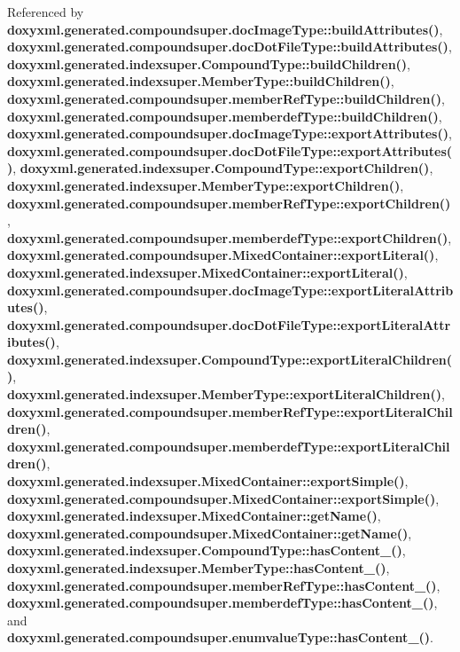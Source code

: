 Referenced by {\bf doxyxml.\+generated.\+compoundsuper.\+doc\+Image\+Type\+::build\+Attributes()}, {\bf doxyxml.\+generated.\+compoundsuper.\+doc\+Dot\+File\+Type\+::build\+Attributes()}, {\bf doxyxml.\+generated.\+indexsuper.\+Compound\+Type\+::build\+Children()}, {\bf doxyxml.\+generated.\+indexsuper.\+Member\+Type\+::build\+Children()}, {\bf doxyxml.\+generated.\+compoundsuper.\+member\+Ref\+Type\+::build\+Children()}, {\bf doxyxml.\+generated.\+compoundsuper.\+memberdef\+Type\+::build\+Children()}, {\bf doxyxml.\+generated.\+compoundsuper.\+doc\+Image\+Type\+::export\+Attributes()}, {\bf doxyxml.\+generated.\+compoundsuper.\+doc\+Dot\+File\+Type\+::export\+Attributes()}, {\bf doxyxml.\+generated.\+indexsuper.\+Compound\+Type\+::export\+Children()}, {\bf doxyxml.\+generated.\+indexsuper.\+Member\+Type\+::export\+Children()}, {\bf doxyxml.\+generated.\+compoundsuper.\+member\+Ref\+Type\+::export\+Children()}, {\bf doxyxml.\+generated.\+compoundsuper.\+memberdef\+Type\+::export\+Children()}, {\bf doxyxml.\+generated.\+compoundsuper.\+Mixed\+Container\+::export\+Literal()}, {\bf doxyxml.\+generated.\+indexsuper.\+Mixed\+Container\+::export\+Literal()}, {\bf doxyxml.\+generated.\+compoundsuper.\+doc\+Image\+Type\+::export\+Literal\+Attributes()}, {\bf doxyxml.\+generated.\+compoundsuper.\+doc\+Dot\+File\+Type\+::export\+Literal\+Attributes()}, {\bf doxyxml.\+generated.\+indexsuper.\+Compound\+Type\+::export\+Literal\+Children()}, {\bf doxyxml.\+generated.\+indexsuper.\+Member\+Type\+::export\+Literal\+Children()}, {\bf doxyxml.\+generated.\+compoundsuper.\+member\+Ref\+Type\+::export\+Literal\+Children()}, {\bf doxyxml.\+generated.\+compoundsuper.\+memberdef\+Type\+::export\+Literal\+Children()}, {\bf doxyxml.\+generated.\+indexsuper.\+Mixed\+Container\+::export\+Simple()}, {\bf doxyxml.\+generated.\+compoundsuper.\+Mixed\+Container\+::export\+Simple()}, {\bf doxyxml.\+generated.\+indexsuper.\+Mixed\+Container\+::get\+Name()}, {\bf doxyxml.\+generated.\+compoundsuper.\+Mixed\+Container\+::get\+Name()}, {\bf doxyxml.\+generated.\+indexsuper.\+Compound\+Type\+::has\+Content\+\_\+()}, {\bf doxyxml.\+generated.\+indexsuper.\+Member\+Type\+::has\+Content\+\_\+()}, {\bf doxyxml.\+generated.\+compoundsuper.\+member\+Ref\+Type\+::has\+Content\+\_\+()}, {\bf doxyxml.\+generated.\+compoundsuper.\+memberdef\+Type\+::has\+Content\+\_\+()}, and {\bf doxyxml.\+generated.\+compoundsuper.\+enumvalue\+Type\+::has\+Content\+\_\+()}.

